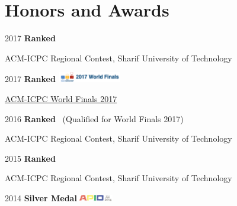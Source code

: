 \documentclass[letterpaper]{article}
\renewenvironment{itemize}{
  \begin{list}{}{
    \setlength{\leftmargin}{1.5em}
  }
}{
  \end{list}
}
\begin{document}
\section*{Honors and Awards}
\begin{itemize}
    \item 2017 \hspace*{10pt} \textbf{Ranked }\\
        \hspace*{30pt}
        \begin{small}
             ACM-ICPC Regional Contest, Sharif University of Technology
        \end{small}
    \item 2017 \hspace*{10pt} \textbf{Ranked } \hspace*{80pt}\includegraphics[height=0.45cm]{ICPCWF17}\\
        \hspace*{30pt}
        \begin{small}
            \href{http://icpc.baylor.edu/worldfinals/results}{ACM-ICPC World Finals 2017}
        \end{small}
    \item 2016 \hspace*{10pt} \textbf{Ranked }\ (Qualified for World Finals 2017)\\
        \hspace*{30pt}
        \begin{small}
             ACM-ICPC Regional Contest, Sharif University of Technology
        \end{small}
    \item 2015 \hspace*{10pt} \textbf{Ranked }\\
        \hspace*{30pt}
        \begin{small}
             ACM-ICPC Regional Contest, Sharif University of Technology
        \end{small}
    \item 2014 \hspace*{10pt} \textbf{Silver Medal}\hspace*{80pt}\includegraphics[height=0.3cm]{APIO14}\\

\end{itemize}
\end{document}
